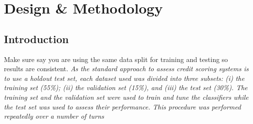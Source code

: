 
\chapter{Design \& Methodology} %

\label{Chapter4} %


\section{Introduction}

Make sure say you are using the same data split for training and testing so results are consistent.
\textit{
As the standard approach to assess credit scoring
systems is to use a holdout test set, each dataset used was divided into three subsets:
(i) the training set (55\%); (ii) the validation set (15\%), and (iii) the test set (30\%).
The training set and the validation set were used to train and tune the classifiers
while the test set was used to assess their performance. This procedure was performed
repeatedly over a number of turns \citep{kennedy_credit_2013}
}